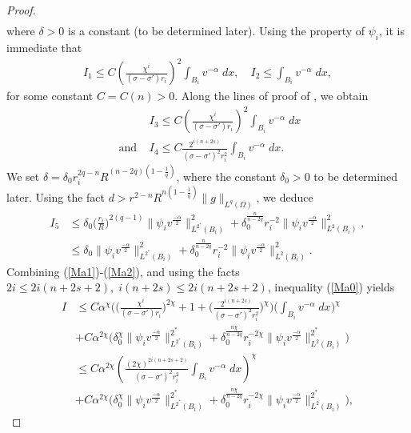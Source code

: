 \documentclass[11pt, notitlepage]{article}
\begin{document}
{\begin{proof}
\begin{align*}
\end{align*}
where $\delta>0$ is a constant (to be determined later). Using the property of $\psi_i$, it is immediate that 
\begin{align}\label{Ma1}
    I_1\leq C\left(\frac{\chi^i}{(\sigma-\sigma')r_i}\right)^2\int_{B_i}v^{-\alpha}\;dx,\quad I_2\leq \int_{B_i}v^{-\alpha}\;dx,
\end{align}
for some constant $C=C(n)>0$. Along the lines of proof of \cite[inequality (4.8)-(4.9), page 16]{Garain25}, we obtain
\begin{align}
    &I_3\leq C\left(\frac{\chi^i}{(\sigma-\sigma')r_i}\right)^2\int_{B_i}v^{-\alpha}\;dx\\
   \text{ and } &I_4\leq C\frac{2^{i(n+2s)}}{(\sigma-\sigma')^2r_i^2}\int_{B_i}v^{-\alpha}\;dx.
\end{align}
We set $\delta=\delta_0r_i^{2q-n}R^{(n-2q)(1-\frac{1}{q})}$, where the constant $\delta_0>0$ to be determined later. Using the fact $d>r^{2-n}R^{n(1-\frac{1}{q})}\|g\|_{L^q(\Omega)}$, we deduce
\begin{align}\label{Ma2}
    I_5&\leq \delta_0\Big(\frac{r_i}{R}\Big)^{2(q-1)}\|\psi_iv^\frac{-\alpha}{2}\|_{L^{2^*}(B_i)}^2+\delta_0^\frac{n}{n-2q}r_i^{-2}\|\psi_iv^\frac{-\alpha}{2}\|_{L^{2}(B_i)}^2,\nonumber\\
    &\leq \delta_0\|\psi_iv^\frac{-\alpha}{2}\|_{L^{2^*}(B_i)}^2+\delta_0^\frac{n}{n-2q}r_i^{-2}\|\psi_iv^\frac{-\alpha}{2}\|_{L^{2}(B_i)}^2.
\end{align}
Combining (\ref{Ma1})-(\ref{Ma2}), and using the facts $2i\leq 2i(n+2s+2),\;i(n+2s)\leq 2i(n+2s+2)$, inequality (\ref{Ma0}) yields
\begin{align}\label{Ma3}
    I&\leq C\alpha^\chi\Big( \big(\frac{\chi^i}{(\sigma-\sigma')r_i}\big)^{2\chi}+1+ \big( \frac{2^{i(n+2s)}}{(\sigma-\sigma')^2r_i^2}\big)^\chi \Big) \Big(\int_{B_i}v^{-\alpha}\;dx\Big)^\chi\nonumber\\
    &+C\alpha^{2\chi}\Big(\delta_0^\chi\|\psi_iv^\frac{-\alpha}{2}\|_{L^{2^*}(B_i)}^{2^*}+\delta_0^\frac{n\chi}{n-2q}r_i^{-2\chi}\|\psi_iv^\frac{-\alpha}{2}\|_{L^{2}(B_i)}^{2^*}\Big)\nonumber\\
    &\leq C\alpha^{2\chi}\left(\frac{(2\chi)^{2i(n+2s+2)}}{(\sigma-\sigma')^2r_i^2}\int_{B_i}v^{-\alpha}\;dx\right)^\chi\nonumber\\
    &+C\alpha^{2\chi}\Big(\delta_0^\chi\|\psi_iv^\frac{-\alpha}{2}\|_{L^{2^*}(B_i)}^{2^*}+\delta_0^\frac{n\chi}{n-2q}r_i^{-2\chi}\|\psi_iv^\frac{-\alpha}{2}\|_{L^{2}(B_i)}^{2^*}\Big),
\end{align}

\end{proof}}
\end{document}
